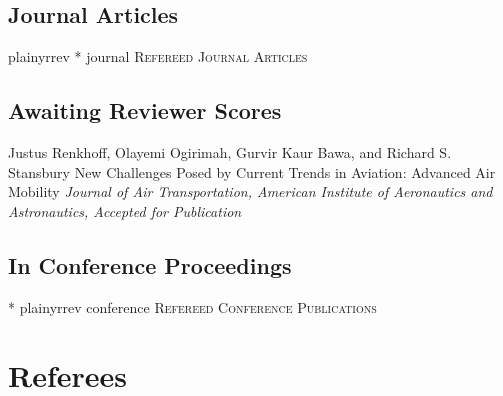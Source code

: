\documentclass[11pt,a4paper,sans]{moderncv} %
\begin{document}
\subsection{Journal Articles}
{plainyrrev}
\nocite{journal}{*}
{journal}
{\large \textsc{Refereed Journal Articles}}
\subsection{Awaiting Reviewer Scores}
 {Justus Renkhoff, Olayemi Ogirimah,  Gurvir Kaur Bawa, and Richard S. Stansbury} {New Challenges Posed by Current Trends in Aviation: Advanced Air Mobility
}{\textit{Journal of Air Transportation, American Institute of Aeronautics and Astronautics, Accepted for Publication}}{}{}

\subsection{In Conference Proceedings}
\nocite{conference}{*}
{plainyrrev}
{conference}
{\large \textsc{Refereed Conference Publications}}
\section{Referees}
\end{document}
